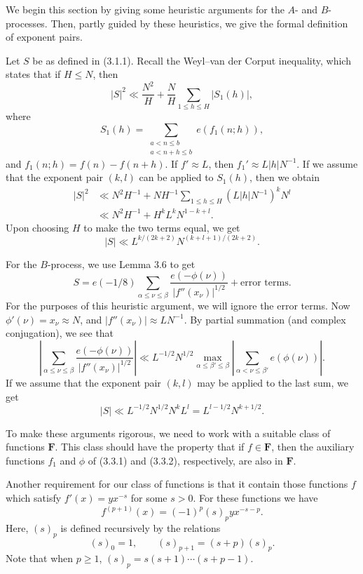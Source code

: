 \documentclass[10pt]{article}
\newcommand{\Fclass}{\mathbf{F}}
\begin{document}
We begin this section by giving some heuristic arguments for the $A$- and
$B$-processes. Then, partly guided by these heuristics, we give the formal
definition of exponent pairs.

Let $S$ be as defined in (3.1.1). Recall the Weyl--van der Corput inequality,
which states that if $H\leq N$, then
\[
 |S|^2\ll\frac{N^2}{H}+\frac NH\sum_{1\leq h\leq H}|S_1(h)|,
\]
where
\begin{equation*}
 S_1(h)=\sum_{\substack{a<n\leq b\\a<n+h\leq b}}e(f_1(n;h)), \tag{3.3.1}
\end{equation*}
and $f_1(n;h)=f(n)-f(n+h)$. If $f'\approx L$, then
$f_1'\approx L|h|N^{-1}$. If we assume that the exponent pair $(k,l)$ can be
applied to $S_1(h)$, then we obtain
\[
\begin{aligned}
 |S|^2
 &\ll N^2H^{-1}+NH^{-1}\sum_{1\leq h\leq H}
      (L|h|N^{-1})^kN^l \\
 &\ll N^2H^{-1}+H^kL^kN^{1-k+l}.
\end{aligned}
\]
Upon choosing $H$ to make the two terms equal, we get
\[
 |S|\ll L^{k/(2k+2)}N^{(k+l+1)/(2k+2)}.
\]

For the $B$-process, we use Lemma 3.6 to get
\begin{equation*}
 S=e(-1/8)\sum_{\alpha\leq\nu\leq\beta}
 \frac{e(-\phi(\nu))}{|f''(x_\nu)|^{1/2}}+\text{error terms}. \tag{3.3.2}
\end{equation*}
For the purposes of this heuristic argument, we will ignore the error terms.
Now $\phi'(\nu)=x_\nu\approx N$, and
$|f''(x_\nu)|\approx LN^{-1}$. By partial summation (and complex conjugation),
we see that
\[
 \left|\sum_{\alpha\leq\nu\leq\beta}
 \frac{e(-\phi(\nu))}{|f''(x_\nu)|^{1/2}}\right|
 \ll L^{-1/2}N^{1/2}
 \max_{\alpha\leq\beta'\leq\beta}
 \left|\sum_{\alpha<\nu\leq\beta'}e(\phi(\nu))\right|.
\]
If we assume that the exponent pair $(k,l)$ may be applied to the last sum,
we get
\[
 |S|\ll L^{-1/2}N^{1/2}N^kL^l
 =L^{l-1/2}N^{k+1/2}.
\]

To make these arguments rigorous, we need to work with a suitable class of
functions $\Fclass$. This class should have the property that if
$f\in\Fclass$, then the auxiliary functions $f_1$ and $\phi$ of (3.3.1) and
(3.3.2), respectively, are also in $\Fclass$.

Another requirement for our class of functions is that it contain those
functions $f$ which satisfy $f'(x)=yx^{-s}$ for some $s>0$. For these
functions we have
\[
 f^{(p+1)}(x)=(-1)^p(s)_p yx^{-s-p}.
\]
Here, $(s)_p$ is defined recursively by the relations
\[
 (s)_0=1,
 \qquad
 (s)_{p+1}=(s+p)(s)_p.
\]
Note that when $p\geq1$, $(s)_p=s(s+1)\cdots(s+p-1)$.
\end{document}
